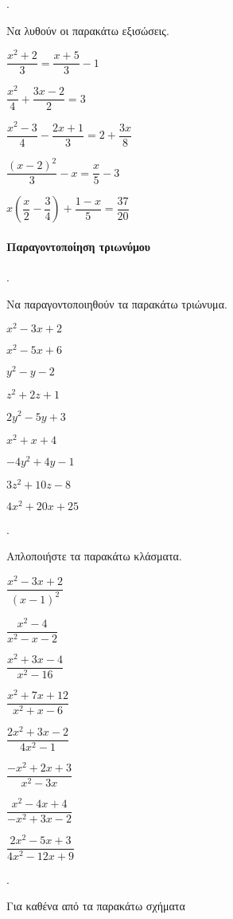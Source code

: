 \documentclass[11pt,a4paper,twocolumn]{article}
\newcounter{askhsh}
\newcommand{\askhsh}{\large\theaskhsh.\ \addtocounter{askhsh}{1}}
\begin{document}
\askhsh Να λυθούν οι παρακάτω εξισώσεις.
\begin{alist}
\item $\dfrac{x^2+2}{3}=\dfrac{x+5}{3}-1$
\item $\dfrac{x^2}{4}+\dfrac{3x-2}{2}=3$
\item $ \dfrac{x^2-3}{4}-\dfrac{2x+1}{3}=2+\dfrac{3x}{8} $
\item $ \dfrac{(x-2)^2}{3}-x=\dfrac{x}{5}-3 $
\item $ x\left(\dfrac{x}{2}-\dfrac{3}{4} \right)+\dfrac{1-x}{5}=\dfrac{37}{20}  $
\end{alist}
\paragraph{Παραγοντοποίηση τριωνύμου}
\askhsh Να παραγοντοποιηθούν τα παρακάτω τριώνυμα.
\begin{multicols}{2}
\begin{alist}
\item $ x^2-3x+2 $
\item $ x^2-5x+6 $
\item $ y^2-y-2 $
\item $ z^2+2z+1 $
\item $ 2y^2-5y+3 $
\item $ x^2+x+4 $
\item $ -4y^2+4y-1 $
\item $ 3z^2+10z-8 $
\item $ 4x^2+20x+25 $
\end{alist}
\end{multicols}
\askhsh Απλοποιήστε τα παρακάτω κλάσματα.
\begin{multicols}{2}
\begin{alist}
\item $\dfrac{x^2-3x+2}{(x-1)^2}$
\item $\dfrac{x^2-4}{x^2-x-2}$
\item $\dfrac{x^2+3x-4}{x^2-16}$
\item $\dfrac{x^2+7x+12}{x^2+x-6}$
\item $\dfrac{2x^2+3x-2}{4x^2-1}$
\item $\dfrac{-x^2+2x+3}{x^2-3x}$
\item $\dfrac{x^2-4x+4}{-x^2+3x-2}$
\item $\dfrac{2x^2-5x+3}{4x^2-12x+9}$
\end{alist}
\end{multicols}
\askhsh Για καθένα από τα παρακάτω σχήματα 
\end{document}
